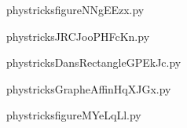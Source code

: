 
    \newcommand{\CaptionFigfigureNNgEEzx}{<+Type your caption here+>}
    \begin{center}
        
    \end{center}
    phystricksfigureNNgEEzx.py

    

    \clearpage
    


    \newcommand{\CaptionFigJRCJooPHFcKn}{<+Type your caption here+>}
    \begin{center}
        
    \end{center}
    phystricksJRCJooPHFcKn.py

    

    \clearpage
    


    \newcommand{\CaptionFigDansRectangleGPEkJc}{<+Type your caption here+>}
    \begin{center}
        
    \end{center}
    phystricksDansRectangleGPEkJc.py

    

    \clearpage
    


    \newcommand{\CaptionFigGrapheAffinHqXJGx}{<+Type your caption here+>}
    \begin{center}
        
    \end{center}
    phystricksGrapheAffinHqXJGx.py

    

    \clearpage
    


    \newcommand{\CaptionFigfigureMYeLqLl}{<+Type your caption here+>}
    \begin{center}
        
    \end{center}
    phystricksfigureMYeLqLl.py

    

    \clearpage
    



